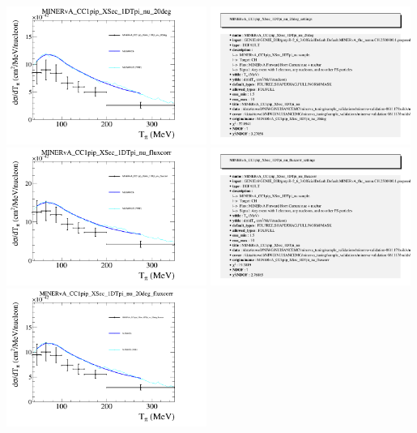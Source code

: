 \documentclass{article}
\begin{document}
\centering
\includegraphics[width=0.49\textwidth]{figures/nuisance_MINERvA_CC1pip_XSec_1DTpi_nu_20deg_comp.png}
\includegraphics[width=0.49\textwidth]{figures/nuisance_MINERvA_CC1pip_XSec_1DTpi_nu_20deg_info.png}
\centering
\includegraphics[width=0.49\textwidth]{figures/nuisance_MINERvA_CC1pip_XSec_1DTpi_nu_fluxcorr_comp.png}
\includegraphics[width=0.49\textwidth]{figures/nuisance_MINERvA_CC1pip_XSec_1DTpi_nu_fluxcorr_info.png}
\centering
\includegraphics[width=0.49\textwidth]{figures/nuisance_MINERvA_CC1pip_XSec_1DTpi_nu_20deg_fluxcorr_comp.png}
\end{document}
